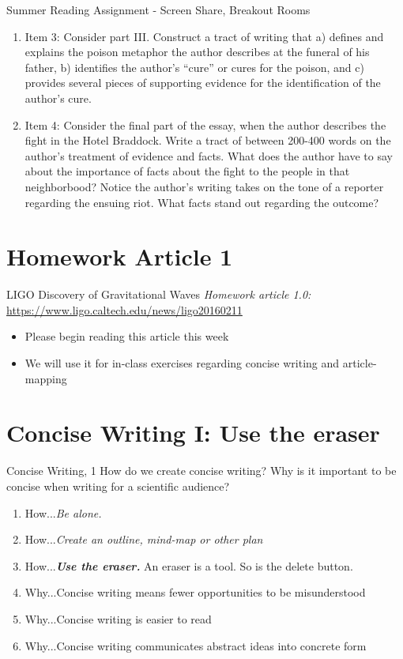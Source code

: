 \documentclass{beamer}
\begin{document}
\begin{frame}{Summer Reading Assignment - Screen Share, Breakout Rooms}
\small
\begin{enumerate}
\item Item 3: Consider part III. Construct a tract of writing that a) defines and explains the poison metaphor the
author describes at the funeral of his father, b) identifies the author’s “cure” or cures for the poison, and c)
provides several pieces of supporting evidence for the identification of the author’s cure.
\item Item 4: Consider the final part of the essay, when the author describes the fight in the Hotel Braddock. Write
a tract of between 200-400 words on the author’s treatment of evidence and facts. What does the author have
to say about the importance of facts about the fight to the people in that neighborbood? Notice the author’s
writing takes on the tone of a reporter regarding the ensuing riot. What facts stand out regarding the outcome?
\end{enumerate}
\end{frame}

\section{Homework Article 1}

\begin{frame}{LIGO Discovery of Gravitational Waves}
\textit{Homework article 1.0:} \\
\url{https://www.ligo.caltech.edu/news/ligo20160211} \\
\begin{itemize}
\item Please begin reading this article this week
\item We will use it for in-class exercises regarding concise writing and article-mapping
\end{itemize}
\end{frame}

\section{Concise Writing I: Use the eraser}

\begin{frame}{Concise Writing, 1}
How do we create concise writing?  Why is it important to be concise when writing for a scientific audience?
\begin{enumerate}
\item How...\textit{Be alone.}
\item How...\textit{Create an outline, mind-map or other plan}
\item How...\textit{\textbf{Use the eraser.}}  An eraser is a tool.  So is the delete button.
\item Why...Concise writing means fewer opportunities to be misunderstood
\item Why...Concise writing is easier to read
\item Why...Concise writing communicates abstract ideas into concrete form
\end{enumerate}
\end{frame}
\end{document}
